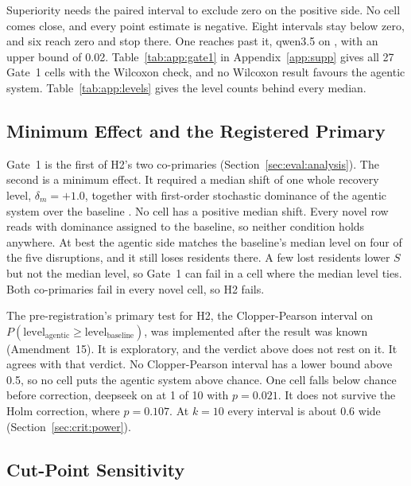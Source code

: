 Superiority needs the paired interval to exclude zero on the positive side. No
cell comes close, and every point estimate is negative. Eight intervals stay
below zero, and six reach zero and stop there. One reaches past it, qwen3.5 on
, with an upper bound of 0.02.
Table~\ref{tab:app:gate1} in Appendix~\ref{app:supp} gives all 27 Gate~1
cells with the Wilcoxon check, and no Wilcoxon result favours the agentic
system. Table~\ref{tab:app:levels} gives the level counts behind every median.

\subsection{Minimum Effect and the Registered Primary}
\label{sec:res:novel:delta}
\label{sec:res:novel:prereg}

Gate~1 is the first of H2's two co-primaries (Section~\ref{sec:eval:analysis}).
The second is a minimum effect. It required a median shift of one whole recovery
level, $\delta_m = +1.0$, together with first-order stochastic dominance of the
agentic system over the baseline \parencite{yalonetzky2013}. No cell has a
positive median shift. Every novel row reads  with
dominance assigned to the baseline, so neither condition holds anywhere. At
best the agentic side matches the baseline's median level on four of the five
disruptions, and it still loses residents there. A few lost residents lower
$S$ but not the median level, so Gate~1 can fail in a cell where the median
level ties. Both co-primaries fail in every novel cell, so H2 fails.

The pre-registration's primary test for H2, the Clopper-Pearson interval on
$P(\text{level}_{\text{agentic}} \geq \text{level}_{\text{baseline}})$, was
implemented after the result was known (Amendment~15). It is exploratory, and
the verdict above does not rest on it. It agrees with that verdict. No
Clopper-Pearson interval has a lower bound above 0.5, so no cell puts the
agentic system above chance. One cell falls below chance before correction,
deepseek on  at 1 of 10 with $p = 0.021$.
It does not survive the Holm correction, where $p = 0.107$. At $k = 10$ every
interval is about 0.6 wide (Section~\ref{sec:crit:power}).

\subsection{Cut-Point Sensitivity}
\label{sec:res:sensitivity}

